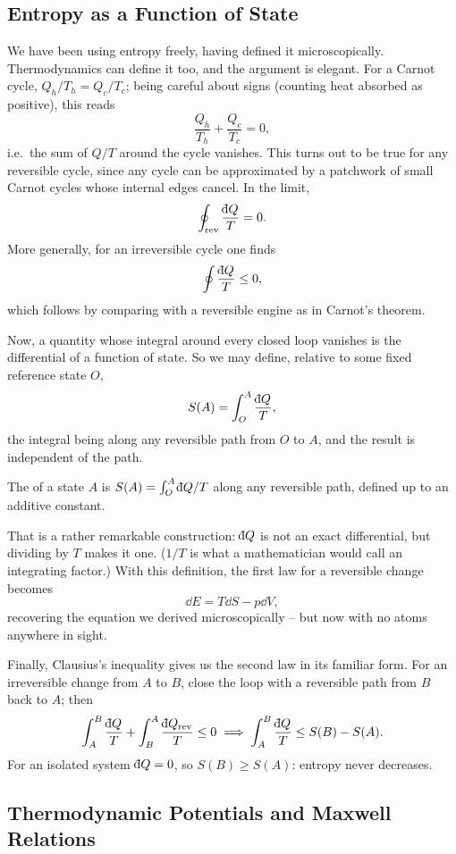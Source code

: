 \documentclass[a4paper]{scrartcl}
\newcommand{\dbar}{\mathchar'26\mkern-11mu \mathrm{d}}
\begin{document}
\subsection{Entropy as a Function of State}

We have been using entropy freely, having defined it microscopically. Thermodynamics can define it too, and the argument is elegant. For a Carnot cycle, $Q_h/T_h = Q_c/T_c$; being careful about signs (counting heat absorbed as positive), this reads
$$
\frac{Q_h}{T_h} + \frac{Q_c}{T_c} = 0,
$$
i.e.\ the sum of $Q/T$ around the cycle vanishes. This turns out to be true for any reversible cycle, since any cycle can be approximated by a patchwork of small Carnot cycles whose internal edges cancel. In the limit,
$$
\oint_{\mathrm{rev}}\frac{\dbar Q}{T} = 0.
$$
More generally, for an irreversible cycle one finds 
$$
\oint \frac{\dbar Q}{T} \leq 0,
$$
which follows by comparing with a reversible engine as in Carnot's theorem.

Now, a quantity whose integral around every closed loop vanishes is the differential of a function of state. So we may define, relative to some fixed reference state $O$,
$$
S(A) = \int_O^A \frac{\dbar Q}{T},
$$
the integral being along any reversible path from $O$ to $A$, and the result is independent of the path.

\begin{definition}
	The  of a state $A$ is $S(A) = \int_O^A \dbar Q/T$ along any reversible path, defined up to an additive constant.
\end{definition}

That is a rather remarkable construction: $\dbar Q$ is not an exact differential, but dividing by $T$ makes it one. ($1/T$ is what a mathematician would call an integrating factor.) With this definition, the first law for a reversible change becomes
$$
\dd E = T\dd S - p\dd V,
$$
recovering the equation we derived microscopically -- but now with no atoms anywhere in sight.

Finally, Clausius's inequality gives us the second law in its familiar form. For an irreversible change from $A$ to $B$, close the loop with a reversible path from $B$ back to $A$; then
$$
\int_A^B \frac{\dbar Q}{T} + \int_B^A \frac{\dbar Q_{\mathrm{rev}}}{T} \leq 0 \implies \int_A^B\frac{\dbar Q}{T} \leq S(B) - S(A).
$$
For an isolated system $\dbar Q = 0$, so $S(B) \geq S(A)$: entropy never decreases.

\subsection{Thermodynamic Potentials and Maxwell Relations}\label{sec:potentials}
\end{document}

